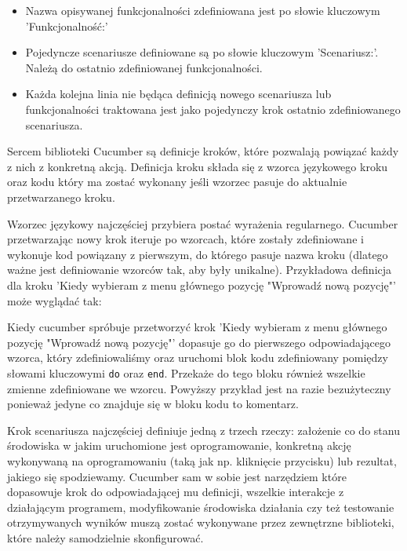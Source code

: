         \begin{itemize}
          \item Nazwa opisywanej funkcjonalności zdefiniowana jest po słowie kluczowym 'Funkcjonalność:'
          \item Pojedyncze scenariusze definiowane są po słowie kluczowym 'Scenariusz:'. Należą do ostatnio zdefiniowanej funkcjonalności.
          \item Każda kolejna linia nie będąca definicją nowego scenariusza lub funkcjonalności traktowana jest jako pojedynczy krok ostatnio zdefiniowanego scenariusza.
        \end{itemize}
        
      Sercem biblioteki Cucumber są definicje kroków, które pozwalają powiązać każdy z nich z konkretną akcją. Definicja kroku składa się z wzorca językowego kroku oraz kodu który ma zostać wykonany jeśli wzorzec pasuje do aktualnie przetwarzanego kroku.
      
      Wzorzec językowy najczęściej przybiera postać wyrażenia regularnego. Cucumber przetwarzając nowy krok iteruje po wzorcach, które zostały zdefiniowane i wykonuje kod powiązany z pierwszym, do którego pasuje nazwa kroku (dlatego ważne jest definiowanie wzorców tak, aby były unikalne). Przykładowa definicja dla kroku 'Kiedy wybieram z menu głównego pozycję "Wprowadź nową pozycję"' może wyglądać tak:
      
      
      
      Kiedy cucumber spróbuje przetworzyć krok 'Kiedy wybieram z menu głównego pozycję "Wprowadź nową pozycję"' dopasuje go do pierwszego odpowiadającego wzorca, który zdefiniowaliśmy oraz uruchomi blok kodu zdefiniowany pomiędzy słowami kluczowymi \verb+do+ oraz \verb+end+. Przekaże do tego bloku również wszelkie zmienne zdefiniowane we wzorcu. Powyższy przykład jest na razie bezużyteczny ponieważ jedyne co znajduje się w bloku kodu to komentarz.
      
      Krok scenariusza najczęściej definiuje jedną z trzech rzeczy: założenie co do stanu środowiska w jakim uruchomione jest oprogramowanie, konkretną akcję wykonywaną na oprogramowaniu (taką jak np. kliknięcie przycisku) lub rezultat, jakiego się spodziewamy. Cucumber sam w sobie jest narzędziem które dopasowuje krok do odpowiadającej mu definicji, wszelkie interakcje z działającym programem, modyfikowanie środowiska działania czy też testowanie otrzymywanych wyników muszą zostać wykonywane przez zewnętrzne biblioteki, które należy samodzielnie skonfigurować.
      

